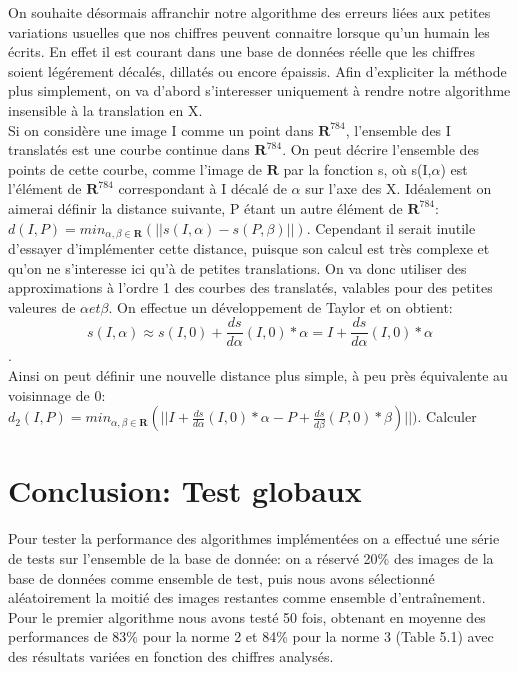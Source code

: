 \documentclass[a4paper,11pt,twoside]{report}
\begin{document}
On souhaite désormais affranchir notre algorithme des erreurs liées aux petites variations usuelles que nos chiffres peuvent connaitre lorsque qu'un humain les écrits. En effet il est courant dans une base de données réelle que les chiffres soient légérement décalés, dillatés ou encore épaissis. Afin d'expliciter la méthode plus simplement, on va d'abord s'interesser uniquement à rendre notre algorithme insensible à la translation en X. \\
Si on considère une image I comme un point dans $\textbf{R}^{784}$, l'ensemble des I translatés est une courbe continue dans $\textbf{R}^{784}$. On peut décrire l'ensemble des points de cette courbe, comme l'image de $\textbf{R}$ par la fonction s, où s(I,$\alpha$) est l'élément de  $\textbf{R}^{784}$ correspondant à I décalé de $\alpha$ sur l'axe des X. Idéalement on aimerai définir la distance suivante, P étant un autre élément de $\textbf{R}^{784}$: $d(I,P)= min_{\alpha,\beta \in \textbf{R}} (||s(I,\alpha)-s(P,\beta)||)$. Cependant il serait inutile d'essayer d'implémenter cette distance, puisque son calcul est très complexe et qu'on ne s'interesse ici qu'à de petites translations. On va donc utiliser des approximations à l'ordre 1 des courbes des translatés, valables pour des petites valeures de $\alpha et \beta$. On effectue un développement de Taylor et on obtient:$$s(I,\alpha)\approx s(I,0) + \frac{ds}{d\alpha}(I,0)*\alpha=I + \frac{ds}{d\alpha}(I,0)*\alpha$$.\\
Ainsi on peut définir une nouvelle distance plus simple, à peu près équivalente au voisinnage de 0: $d_{2}(I,P)= min_{\alpha,\beta \in \textbf{R}} (||I+\frac{ds}{d\alpha}(I,0)*\alpha-P+\frac{ds}{d\beta}(P,0)*\beta)||)$. Calculer 

\chapter{Conclusion: Test globaux}

Pour tester la performance des algorithmes implémentées on a effectué une série de tests sur l'ensemble de la base de donnée: on a réservé 20\% des images de la base de données comme ensemble de test, puis nous avons sélectionné aléatoirement la moitié des images restantes comme ensemble d’entraînement.\\

Pour le premier algorithme nous avons testé 50 fois, obtenant en moyenne des performances de 83\% pour la norme 2 et 84\% pour la norme 3 (Table 5.1) avec des résultats variées en fonction des chiffres analysés.
\end{document}
